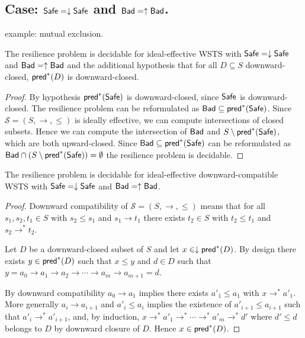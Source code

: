 



\subsection{Case: $\textsf{Safe}=\downarrow \textsf{Safe}$ and $\textsf{Bad}=\uparrow \textsf{Bad}$.}
%
%
example: mutual exclusion.

\begin{theorem}
The resilience problem is decidable for ideal-effective WSTS with 
$\textsf{Safe}=\downarrow \textsf{Safe}$
and $\textsf{Bad}=\uparrow \textsf{Bad}$
and
the additional hypothesis that
for all $D \subseteq S$ downward-closed, $\textsf{pred}^*(D)$ is downward-closed.
\end{theorem}

\begin{proof}
By hypothesis $\textsf{pred}^*(\textsf{Safe})$ is downward-closed, since $\textsf{Safe}$ is downward-closed.
The resilience problem can be reformulated as 
$\textsf{Bad} \subseteq  \textsf{pred}^*(\textsf{Safe})$.
Since $\mathscr{S}=(S,\rightarrow, \leq)$ is ideally effective, we can compute intersections of closed subsets.
Hence we can compute the intersection of
$\textsf{Bad}$
and
$S \setminus \textsf{pred}^*(\textsf{Safe})$,
which are both upward-closed.
Since
$\textsf{Bad} \subseteq \textsf{pred}^*(\textsf{Safe})$
can be reformulated as
$\textsf{Bad} \cap (S \setminus \textsf{pred}^*(\textsf{Safe})) = \emptyset$
the resilience problem is decidable.
\end{proof}

\begin{corollary}
The resilience problem is decidable for ideal-effective downward-compatible WSTS with 
$\textsf{Safe}=\downarrow \textsf{Safe}$
and $\textsf{Bad}=\uparrow \textsf{Bad}$.
\end{corollary}

\begin{proof}
Downward compatibility of $\mathscr{S}=(S,\rightarrow, \leq)$ 
means that
for all $s_1, s_2, t_1 \in S$ with
$s_2 \leq s_1$ and $s_1 \to t_1$
there
exists $t_2 \in S$ with
$t_2 \leq t_1$ and $s_2 \to^* t_2$.

Let $D$ be a downward-closed subset of $S$
and let $x \in \downarrow \textsf{pred}^*(D)$.
By design there exists
$y \in \textsf{pred}^*(D)$ 
such that $x \leq y$
and $d \in D$ such that
$y = a_0 \to a_1 \to a_2 \to \cdots \to a_m \to a_{m+1} = d$.

By downward compatibility $a_0 \to a_1$
implies there exists $a'_1 \leq a_1$ with
$x \to^* a'_1$.
More generally $a_i \to a_{i+1}$ and
$a'_i\leq a_i$ implies the existence of $a'_{i+1} \leq a_{i+1}$ such that
$a'_i \to^* a'_{i+1}$,
and, by induction,
 $x \to^* a'_1 \to^* \cdots \to^* a'_{m} \to^* d'$
where
$d' \leq d$ belongs to $D$ by downward closure of $D$.
Hence $x \in \textsf{pred}^*(D)$.
\end{proof}


